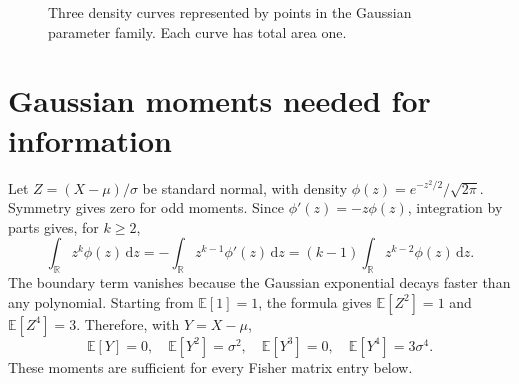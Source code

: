 \documentclass[11pt,oneside,openany]{book}
\theoremstyle{definition}
\theoremstyle{remark}
\newcommand{\R}{\mathbb{R}}
\newcommand{\E}{\mathbb{E}}
\newcommand{\dd}{\,\mathrm{d}}
\numberwithin{equation}{chapter}
\begin{document}
\begin{figure}[htbp]
\centering
{}
\caption{Three density curves represented by points in the Gaussian parameter family. Each curve has total area one.}
\end{figure}

\section{Gaussian moments needed for information}
Let $Z=(X-\mu)/\sigma$ be standard normal, with density $\phi(z)=e^{-z^2/2}/\sqrt{2\pi}$. Symmetry gives zero for odd moments. Since $\phi'(z)=-z\phi(z)$, integration by parts gives, for $k\geq2$,
\[
\int_{\R}z^k\phi(z)\dd z
=-\int_{\R}z^{k-1}\phi'(z)\dd z
=(k-1)\int_{\R}z^{k-2}\phi(z)\dd z.
\]
The boundary term vanishes because the Gaussian exponential decays faster than any polynomial. Starting from $\E[1]=1$, the formula gives $\E[Z^2]=1$ and $\E[Z^4]=3$. Therefore, with $Y=X-\mu$,
\begin{equation}\label{eq:gaussianmoments}
\E[Y]=0,\quad\E[Y^2]=\sigma^2,\quad
\E[Y^3]=0,\quad\E[Y^4]=3\sigma^4.
\end{equation}
These moments are sufficient for every Fisher matrix entry below.
\end{document}
